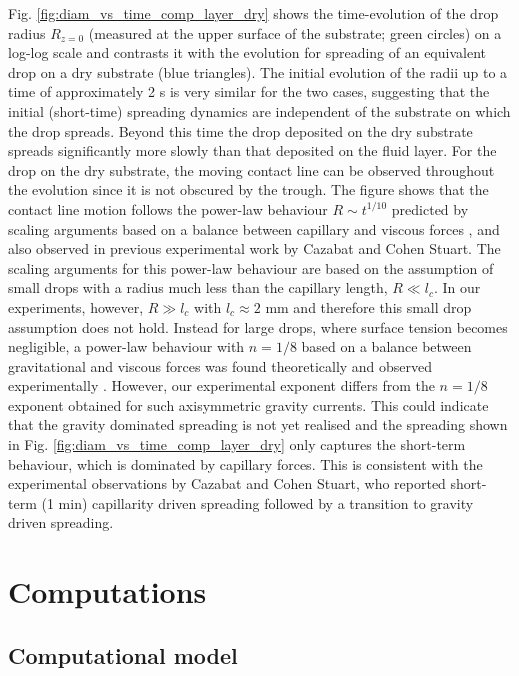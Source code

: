 \documentclass[aip,graphicx]{revtex4-1}
\begin{document}
Fig. \ref{fig:diam_vs_time_comp_layer_dry} shows the time-evolution
of the drop radius $R_{z=0}$ (measured at the upper surface
of the substrate; green circles) on a log-log scale and
contrasts it with the evolution for spreading of an equivalent drop 
on a dry substrate (blue triangles). The initial evolution 
of the radii up to a time of approximately 2 s is very similar for the two 
cases, suggesting that the initial (short-time) spreading dynamics are
independent of the substrate on which the drop spreads.
Beyond this time the drop deposited on the dry substrate spreads
significantly more slowly than that deposited on the fluid layer.
For the drop on the dry substrate, the moving contact line can be
observed throughout the evolution since it is not obscured by the
trough. The figure shows that the contact line motion follows
the power-law behaviour $R \sim t^{1/10}$ predicted by scaling
arguments based on a balance between capillary and viscous forces
\cite{tanner1979spreading}, and also observed in previous experimental
work by Cazabat and Cohen Stuart\cite{cazabat1986dynamics}.
The scaling arguments for this power-law behaviour are based
on the assumption of small drops with a radius much less
than the capillary length, $R \ll l_c$.
In our experiments, however, $R \gg l_c$ with $l_c \approx 2$ mm and
therefore this small drop assumption does not hold.
Instead for large drops, where surface tension becomes negligible, a power-law behaviour with $n=1/8$ based on a
balance between gravitational and viscous forces was found
theoretically \cite{lopez1976spreading} and observed experimentally
\cite{cazabat1986dynamics,huppert1982propagation}.
However, our
experimental exponent differs from the $n=1/8$ exponent obtained for
such axisymmetric gravity currents.
This could indicate that the gravity dominated spreading is not yet
realised and the spreading shown in Fig.
\ref{fig:diam_vs_time_comp_layer_dry} only captures the short-term
behaviour, which is dominated by capillary forces.
This is consistent with the experimental observations by Cazabat and
Cohen Stuart\cite{cazabat1986dynamics}, who reported short-term (1 min) capillarity
driven spreading followed by a transition to gravity driven spreading.


\section{Computations}

\subsection{Computational model}
\end{document}

